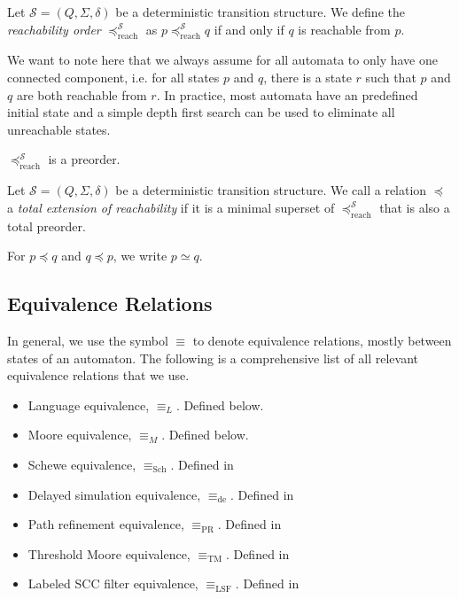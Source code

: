 \begin{defn}
	Let $\mathcal{S} = (Q, \Sigma, \delta)$ be a deterministic transition structure. We define the \emph{reachability order} $\preceq_\text{reach}^\mathcal{S}$ as $p \preceq_\text{reach}^\mathcal{S} q$ if and only if $q$ is reachable from $p$. 
\end{defn}

We want to note here that we always assume for all automata to only have one connected component, i.e. for all states $p$ and $q$, there is a state $r$ such that $p$ and $q$ are both reachable from $r$. In practice, most automata have an predefined initial state and a simple depth first search can be used to eliminate all unreachable states.

\begin{lem}
	$\preceq_\text{reach}^\mathcal{S}$ is a preorder.
\end{lem}

\begin{defn}
	Let $\mathcal{S} = (Q, \Sigma, \delta)$ be a deterministic transition structure. We call a relation $\preceq$ a \emph{total extension of reachability} if it is a minimal superset of $\preceq_\text{reach}^\mathcal{S}$ that is also a total preorder.
	
	For $p \preceq q$ and $q \preceq p$, we write $p \simeq q$.
\end{defn}


\subsection{Equivalence Relations}

In general, we use the symbol $\equiv$ to denote equivalence relations, mostly between states of an automaton. The following is a comprehensive list of all relevant equivalence relations that we use.

\begin{itemize}
	\item Language equivalence, $\equiv_L$. Defined below.
	\item Moore equivalence, $\equiv_M$. Defined below.
	\item Schewe equivalence, $\equiv_\text{Sch}$. Defined in %
	\item Delayed simulation equivalence, $\equiv_\text{de}$. Defined in %
	\item Path refinement equivalence, $\equiv_\text{PR}$. Defined in %
	\item Threshold Moore equivalence, $\equiv_\text{TM}$. Defined in %
	\item Labeled SCC filter equivalence, $\equiv_\text{LSF}$. Defined in %
\end{itemize}


